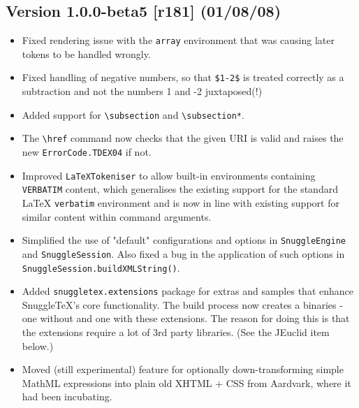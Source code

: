 \subsection*{Version 1.0.0-beta5 [r181] (01/08/08)}

\begin{itemize}

  \item Fixed rendering issue with the \verb|array| environment that was
  causing later tokens to be handled wrongly.

  \item Fixed handling of negative numbers, so that \verb|$1-2$| is treated
  correctly as a subtraction and not the numbers 1 and -2 juxtaposed(!)

  \item Added support for \verb|\subsection| and \verb|\subsection*|.

  \item The \verb|\href| command now checks that the given URI is valid and
  raises the new \verb|ErrorCode.TDEX04| if not.

  \item Improved \verb|LaTeXTokeniser| to allow built-in environments
  containing \verb|VERBATIM| content, which generalises the existing support
  for the standard LaTeX \verb|verbatim| environment and is now in line with
  existing support for similar content within command arguments.

  \item Simplified the use of "default" configurations and options in
  \verb|SnuggleEngine| and \verb|SnuggleSession|. Also fixed a bug in the
  application of such options in \verb|SnuggleSession.buildXMLString()|.

  \item Added \verb|snuggletex.extensions| package for extras and samples
  that enhance SnuggleTeX's core functionality. The build process now creates
  a binaries - one without and one with these extensions. The reason for doing
  this is that the extensions require a lot of 3rd party libraries. (See the
  JEuclid item below.)

  \item Moved (still experimental) feature for optionally down-transforming
  simple MathML expressions into plain old XHTML + CSS from Aardvark, where it
  had been incubating.


\end{itemize}
